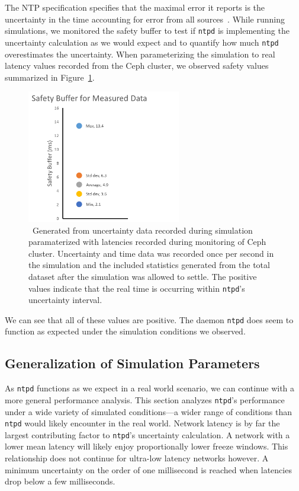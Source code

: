 The NTP specification specifies that the maximal error it reports is
the uncertainty in the time accounting for error from all
sources~\citep{Burbank2010}.  While running simulations, we monitored
the safety buffer to test if \texttt{ntpd} is implementing the
uncertainty calculation as we would expect and to quantify how much
\texttt{ntpd} overestimates the uncertainty.  When parameterizing the
simulation to real latency values recorded from the Ceph cluster, we
observed safety values summarized in Figure~\ref{fig:safety-data}.

\begin{figure}[!htbp]
  \caption{~Generated from uncertainty data recorded during simulation paramaterized
  with latencies recorded during monitoring of Ceph cluster. Uncertainty and time
  data was recorded once per second in the simulation and the included statistics 
  generated from the total dataset after the simulation was allowed to settle. 
  The positive values indicate that the real time is occurring within \texttt{ntpd}'s 
  uncertainty interval.}
  \label{fig:safety-data}
  \centering
  \includegraphics[width=0.6\textwidth]{5pointsSafety.png}
\end{figure}

We can see that all of these values are positive. The daemon
\texttt{ntpd} does seem to function as expected under the simulation
conditions we observed.

\subsection{Generalization of Simulation Parameters}

As \texttt{ntpd} functions as we expect in a real world scenario, we
can continue with a more general performance analysis.  This section
analyzes \texttt{ntpd}'s performance under a wide variety of simulated
conditions---a wider range of conditions than \texttt{ntpd} would
likely encounter in the real world.  Network latency is by far the
largest contributing factor to \texttt{ntpd}'s uncertainty
calculation. A network with a lower mean latency will likely enjoy
proportionally lower freeze windows. This relationship does not
continue for ultra-low latency networks however. A minimum uncertainty
on the order of one millisecond is reached when latencies drop below a
few milliseconds.

